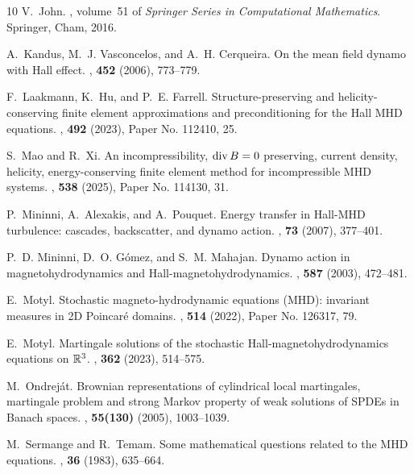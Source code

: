 \documentclass[11pt, reqno]{amsart}
\theoremstyle{definition}
\numberwithin{equation}{section}
\begin{document}
\begin{thebibliography}{10}
	V.~John.
	,
	volume~51 of {\em Springer Series in Computational Mathematics}.
	\newblock Springer, Cham, 2016.
	
	A.~Kandus, M.~J. Vasconcelos, and A.~H. Cerqueira.
	\newblock On the mean field dynamo with {H}all effect.
	,  {\bf 452} (2006), 773--779.
	
	F.~Laakmann, K.~Hu, and P.~E. Farrell.
	\newblock Structure-preserving and helicity-conserving finite element
	approximations and preconditioning for the {H}all {MHD} equations.
	,  {\bf 492} (2023), Paper No. 112410, 25.
	
	S.~Mao and R.~Xi.
	\newblock An incompressibility, {${\rm div}\,B = 0$} preserving, current
	density, helicity, energy-conserving finite element method for incompressible
	{MHD} systems.
	,  {\bf 538} (2025), Paper No. 114130, 31.
	
	P.~Mininni, A.~Alexakis, and A.~Pouquet.
	\newblock Energy transfer in {H}all-{MHD} turbulence: cascades, backscatter,
	and dynamo action.
	,  {\bf 73} (2007), 377–401.
	
	P.~D. Mininni, D.~O. G\'omez, and S.~M. Mahajan.
	\newblock Dynamo action in magnetohydrodynamics and
	{H}all-magnetohydrodynamics.
	,  {\bf 587} (2003), 472--481.
	
	E.~Motyl.
	\newblock Stochastic magneto-hydrodynamic equations ({MHD}): invariant measures
	in 2{D} {P}oincar\'e{} domains.
	,  {\bf 514} (2022), Paper No. 126317, 79.
	
	E.~Motyl.
	\newblock Martingale solutions of the stochastic {H}all-magnetohydrodynamics
	equations on {$\Bbb{R}^3$}.
	,  {\bf 362} (2023), 514--575.
	
	M.~Ondrej\'at.
	\newblock Brownian representations of cylindrical local martingales, martingale
	problem and strong {M}arkov property of weak solutions of {SPDE}s in {B}anach
	spaces.
	,  {\bf 55(130)} (2005), 1003--1039.
	
	M.~Sermange and R.~Temam.
	\newblock Some mathematical questions related to the {MHD} equations.
	,  {\bf 36} (1983), 635--664.
	

\end{thebibliography}
\end{document}
